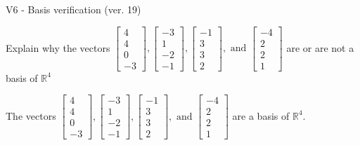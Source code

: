 \begin{exercise}
  \begin{exerciseTitle}V6 - Basis verification (ver. 19)\end{exerciseTitle}
  \begin{exerciseStatement}
    Explain why the vectors \(\left[\begin{array}{r}
4 \\
4 \\
0 \\
-3
\end{array}\right] , \left[\begin{array}{r}
-3 \\
1 \\
-2 \\
-1
\end{array}\right] , \left[\begin{array}{r}
-1 \\
3 \\
3 \\
2
\end{array}\right] , \text{ and } \left[\begin{array}{r}
-4 \\
2 \\
2 \\
1
\end{array}\right]\) are or are not a basis of \(\mathbb{R}^4\)	


  \end{exerciseStatement}
  \begin{exerciseAnswer}
   The vectors \(\left[\begin{array}{r}
4 \\
4 \\
0 \\
-3
\end{array}\right] , \left[\begin{array}{r}
-3 \\
1 \\
-2 \\
-1
\end{array}\right] , \left[\begin{array}{r}
-1 \\
3 \\
3 \\
2
\end{array}\right] , \text{ and } \left[\begin{array}{r}
-4 \\
2 \\
2 \\
1
\end{array}\right]\) 
  	 are  a basis of \(\mathbb{R}^4\).
  


  \end{exerciseAnswer}
\end{exercise}